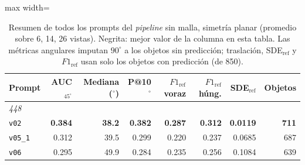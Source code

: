 
\begin{table}[htbp]
\centering
\caption{Resumen de todos los prompts del \textit{pipeline} sin malla, simetría planar (promedio sobre 6, 14, 26 vistas). Negrita: mejor valor de la columna en esta tabla. Las métricas angulares imputan $90^\circ$ a los objetos sin predicción; traslación, SDE$_{\mathrm{ref}}$ y $F1_{\mathrm{ref}}$ usan solo los objetos con predicción (de 850).}
\label{tab:plane_resumen}
\begin{adjustbox}{max width=\textwidth}
\begin{tabular}{lrrrrrrr}
\toprule
Prompt & AUC$_{45^\circ}$ & Mediana ($^\circ$) & P@10$^\circ$ & $F1_{\mathrm{ref}}$ voraz & $F1_{\mathrm{ref}}$ húng. & SDE$_{\mathrm{ref}}$ & Objetos \\
\midrule
\multicolumn{8}{l}{\textit{448}} \\
\quad\texttt{v02} & \textbf{0.384} & \textbf{38.2} & \textbf{0.382} & \textbf{0.287} & \textbf{0.312} & \textbf{0.0119} & \textbf{711} \\
\quad\texttt{v05\_1} & 0.312 & 39.5 & 0.299 & 0.220 & 0.237 & 0.0685 & 687 \\
\quad\texttt{v06} & 0.295 & 49.9 & 0.284 & 0.235 & 0.256 & 0.1084 & 639 \\
\bottomrule
\end{tabular}
\end{adjustbox}
\end{table}
